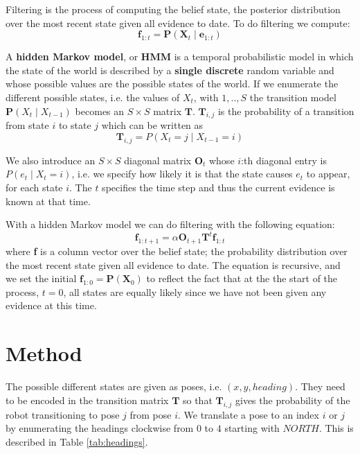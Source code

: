 \documentclass{article}
\begin{document}
Filtering is the process of computing the belief state, the posterior distribution over the most recent state given all evidence to date. To do filtering we compute:
\begin{displaymath}
\textbf{f}_{1:t} = \textbf{P}(\textbf{X}_t \mid \textbf{e}_{1:t})
\end{displaymath}

A \textbf{hidden Markov model}, or \textbf{HMM} is a temporal probabilistic model in which the state of the world is described by a \textbf{single discrete} random variable and whose possible values are the possible states of the world. If we enumerate the different possible states, i.e. the values of $X_t$, with $1,..,S$ the transition model $\textbf{P}(X_t \mid X_{t-1})$ becomes an $S \times S$ matrix $\textbf{T}$. $\textbf{T}_{i,j}$ is the probability of a transition from state $i$ to state $j$ which can be written as 
\begin{displaymath}
\textbf{T}_{i,j} = P(X_t = j \mid X_{t-1} = i)
\end{displaymath}

We also introduce an $S \times S$ diagonal matrix $\textbf{O}_t$ whose $i$:th diagonal entry is $P(e_t \mid X_t = i)$, i.e. we specify how likely it is that the state causes $e_t$ to appear, for each state $i$. The $t$ specifies the time step and thus the current evidence is known at that time.

With a hidden Markov model we can do filtering with the following equation:
\begin{displaymath}
\textbf{f}_{1:t+1} = \alpha \textbf{O}_{t+1} \textbf{T}^t\textbf{f}_{1:t}
\end{displaymath}
where \textbf{f} is a column vector over the belief state; the probability distribution over the most recent state given all evidence to date. The equation is recursive, and we set the initial $\textbf{f}_{1:0}= \textbf{P}(\textbf{X}_0)$ to reflect the fact that at the the start of the process, $t=0$, all states are equally likely since we have not been given any evidence at this time.

\section{Method}
The possible different states are given as poses, i.e. $(x,y,heading)$. They need to be encoded in the transition matrix $\textbf{T}$ so that $\textbf{T}_{i,j}$ gives the probability of the robot transitioning to pose $j$ from pose $i$. We translate a pose to an index $i$ or $j$ by enumerating the headings clockwise from $0$ to $4$ starting with $NORTH$. This is described in Table \ref{tab:headings}.
\end{document}
